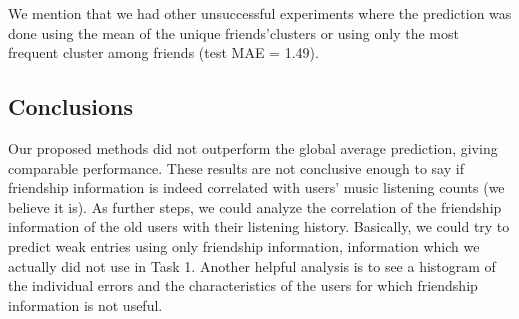 We mention that we had other unsuccessful experiments where the prediction was done using the mean of the unique friends'clusters or using only the most frequent cluster among friends (test MAE = 1.49).

\subsection{Conclusions}
Our proposed methods did not outperform the global average prediction, giving comparable performance. These results are not conclusive enough to say if friendship information is indeed correlated with users' music listening counts (we believe it is). As further steps, we could analyze the correlation of the friendship information of the old users with their listening history. Basically, we could try to predict weak entries using only friendship information, information which we actually did not use in Task 1. Another helpful analysis is to see a histogram of the individual errors and the characteristics of the users for which friendship information is not useful.
